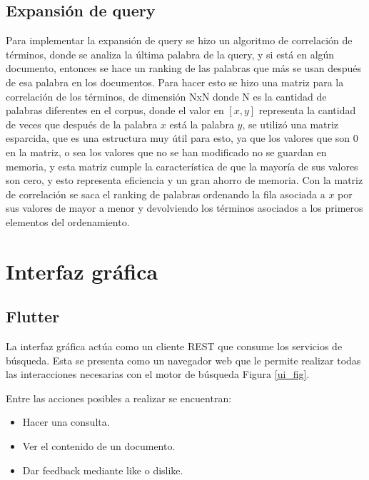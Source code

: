 \documentclass[runningheads]{llncs}
\begin{document}
\subsection{Expansión de query}

Para implementar la expansión de query se hizo un algoritmo de correlación de términos, donde se analiza la última palabra de la 
query, y si está en algún documento, entonces se hace un ranking de las palabras que más se usan después de esa palabra en los
documentos. Para hacer esto se hizo una matriz para la correlación de los términos, de dimensión NxN donde N es la cantidad de 
palabras diferentes en el corpus, donde el valor en $[x,y]$ representa la cantidad de veces que después de la palabra $x$ está 
la palabra $y$, se utilizó una matriz esparcida, que es una estructura muy útil para esto, ya que los valores que son 0 en la 
matriz, o sea los valores que no se han modificado no se guardan en memoria, y esta matriz cumple la característica de que la 
mayoría de sus valores son cero, y esto representa eficiencia y un gran ahorro de memoria. Con la matriz de correlación se saca 
el ranking de palabras ordenando la fila asociada a $x$ por sus valores de mayor a menor y devolviendo los términos asociados a 
los primeros elementos del ordenamiento.

\section{Interfaz gráfica}

\subsection{Flutter}

La interfaz gráfica actúa como un cliente REST que consume los servicios de búsqueda. Esta
se presenta como un navegador web que le permite realizar todas las interacciones necesarias
con el motor de búsqueda Figura \ref{ui_fig}.

Entre las acciones posibles a realizar se encuentran:

\begin{itemize}

\item Hacer una consulta.
\item Ver el contenido de un documento.
\item Dar feedback mediante like o dislike.

\end{itemize}
\end{document}
